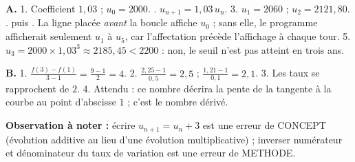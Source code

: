 \documentclass[10pt,a4paper]{article}
\begin{document}
\textbf{A.} 1. Coefficient $1{,}03$ ; $u_0=2000$. . $u_{n+1}=1{,}03\,u_n$.
3. $u_1=2060$ ; $u_2=2121{,}80$. .  puis .
La ligne  placée \emph{avant} la boucle affiche $u_0$ ; sans elle, le programme
afficherait seulement $u_1$ à $u_5$, car l'affectation précède l'affichage à chaque tour.
5. $u_3=2000\times 1{,}03^3\approx 2185{,}45 < 2200$ : non, le seuil n'est pas atteint en trois ans.

\textbf{B.} 1. $\frac{f(3)-f(1)}{3-1}=\frac{9-1}{2}=4$.
2. $\frac{2{,}25-1}{0{,}5}=2{,}5$ ; $\frac{1{,}21-1}{0{,}1}=2{,}1$.
3. Les taux se rapprochent de $2$.
4. Attendu : ce nombre décrira la pente de la tangente à la courbe au point d'abscisse $1$ ; c'est le nombre dérivé.

\textbf{Observation à noter :} écrire $u_{n+1}=u_n+3$ est une erreur de \textsc{CONCEPT} (évolution additive
au lieu d'une évolution multiplicative) ; inverser numérateur et dénominateur du taux de variation est une
erreur de \textsc{METHODE}.
\end{document}
